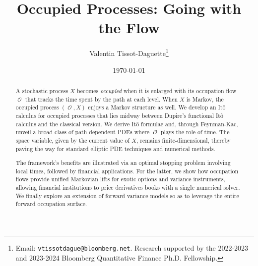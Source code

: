 \documentclass[11pt]{article}
\title{\vspace{-10mm} 
Occupied Processes: Going with the Flow
\vspace{-3mm}}
\date{\today}
\author{Valentin Tissot-Daguette\footnote{Email: {\tt vtissotdague@bloomberg.net}. Research supported by the 2022-2023 and 2023-2024 Bloomberg Quantitative Finance Ph.D. Fellowship.  }}%
\affil
{\footnotesize Quantitative Research, Office of the  CTO, Bloomberg \vspace{-2mm} }
\theoremstyle{plain}
\theoremstyle{definition}
\DeclareMathOperator{\calO}{\mathcal{O}}
\newcommand{\bb}[1]{\textcolor{blue}{#1}}
\begin{document}
\maketitle
\vspace{-1cm}


\vspace{0mm}
\begin{abstract}
 
A stochastic process $X$ becomes \textit{occupied} when it is enlarged with its occupation flow $\calO$ that tracks the time spent by the path at each level. When $X$  is Markov, the occupied process  $(\calO,X)$ enjoys a Markov structure as well. We develop an Itô calculus for occupied processes that lies midway between Dupire's functional Itô calculus and the classical version. We derive  Itô formulae and, through Feynman-Kac, unveil a broad class of path-dependent PDEs where $\calO$ plays the role of time.  The space variable, given by the current value of $X$,  remains finite-dimensional, thereby paving the way for standard elliptic PDE techniques and numerical methods. 

The framework's benefits are   illustrated via an  optimal stopping problem involving local times, followed by financial  applications. For the latter, we  show how occupation flows provide  unified Markovian lifts for exotic options and variance instruments, allowing financial institutions to  price derivatives books with a single numerical solver. We finally explore an extension of forward variance models so as to leverage the entire forward occupation surface.


 


\end{abstract}
\end{document}
